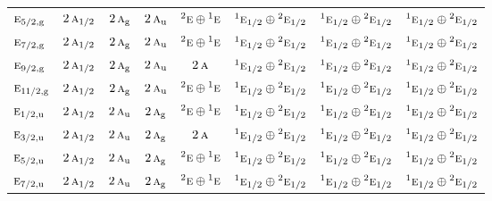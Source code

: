 \documentclass[10pt,a4paper]{article}
\numberwithin{equation}{section}
\newcommand{\irr}[1]{\text{\normalfont\scshape #1}}
\newcommand{\conjpair}[1]{{}^{#1}}
\newcommand{\ptag}[1]{\mathrm{#1}}
\begin{document}
{\begin{longtable}{@{}lccccccc@{}}
$\irr{e}_{5/2,\ptag{g}}$ & $2\,\irr{a}_{1/2}$ & $2\,\irr{a}_{\ptag{g}}$ & $2\,\irr{a}_{\ptag{u}}$ & $\conjpair{2}\irr{e}\oplus \conjpair{1}\irr{e}$ & $\conjpair{1}\irr{e}_{1/2}\oplus \conjpair{2}\irr{e}_{1/2}$ & $\conjpair{1}\irr{e}_{1/2}\oplus \conjpair{2}\irr{e}_{1/2}$ & $\conjpair{1}\irr{e}_{1/2}\oplus \conjpair{2}\irr{e}_{1/2}$\\
$\irr{e}_{7/2,\ptag{g}}$ & $2\,\irr{a}_{1/2}$ & $2\,\irr{a}_{\ptag{g}}$ & $2\,\irr{a}_{\ptag{u}}$ & $\conjpair{2}\irr{e}\oplus \conjpair{1}\irr{e}$ & $\conjpair{1}\irr{e}_{1/2}\oplus \conjpair{2}\irr{e}_{1/2}$ & $\conjpair{1}\irr{e}_{1/2}\oplus \conjpair{2}\irr{e}_{1/2}$ & $\conjpair{1}\irr{e}_{1/2}\oplus \conjpair{2}\irr{e}_{1/2}$\\
$\irr{e}_{9/2,\ptag{g}}$ & $2\,\irr{a}_{1/2}$ & $2\,\irr{a}_{\ptag{g}}$ & $2\,\irr{a}_{\ptag{u}}$ & $2\,\irr{a}$ & $\conjpair{1}\irr{e}_{1/2}\oplus \conjpair{2}\irr{e}_{1/2}$ & $\conjpair{1}\irr{e}_{1/2}\oplus \conjpair{2}\irr{e}_{1/2}$ & $\conjpair{1}\irr{e}_{1/2}\oplus \conjpair{2}\irr{e}_{1/2}$\\
$\irr{e}_{11/2,\ptag{g}}$ & $2\,\irr{a}_{1/2}$ & $2\,\irr{a}_{\ptag{g}}$ & $2\,\irr{a}_{\ptag{u}}$ & $\conjpair{2}\irr{e}\oplus \conjpair{1}\irr{e}$ & $\conjpair{1}\irr{e}_{1/2}\oplus \conjpair{2}\irr{e}_{1/2}$ & $\conjpair{1}\irr{e}_{1/2}\oplus \conjpair{2}\irr{e}_{1/2}$ & $\conjpair{1}\irr{e}_{1/2}\oplus \conjpair{2}\irr{e}_{1/2}$\\
$\irr{e}_{1/2,\ptag{u}}$ & $2\,\irr{a}_{1/2}$ & $2\,\irr{a}_{\ptag{u}}$ & $2\,\irr{a}_{\ptag{g}}$ & $\conjpair{2}\irr{e}\oplus \conjpair{1}\irr{e}$ & $\conjpair{1}\irr{e}_{1/2}\oplus \conjpair{2}\irr{e}_{1/2}$ & $\conjpair{1}\irr{e}_{1/2}\oplus \conjpair{2}\irr{e}_{1/2}$ & $\conjpair{1}\irr{e}_{1/2}\oplus \conjpair{2}\irr{e}_{1/2}$\\
$\irr{e}_{3/2,\ptag{u}}$ & $2\,\irr{a}_{1/2}$ & $2\,\irr{a}_{\ptag{u}}$ & $2\,\irr{a}_{\ptag{g}}$ & $2\,\irr{a}$ & $\conjpair{1}\irr{e}_{1/2}\oplus \conjpair{2}\irr{e}_{1/2}$ & $\conjpair{1}\irr{e}_{1/2}\oplus \conjpair{2}\irr{e}_{1/2}$ & $\conjpair{1}\irr{e}_{1/2}\oplus \conjpair{2}\irr{e}_{1/2}$\\
$\irr{e}_{5/2,\ptag{u}}$ & $2\,\irr{a}_{1/2}$ & $2\,\irr{a}_{\ptag{u}}$ & $2\,\irr{a}_{\ptag{g}}$ & $\conjpair{2}\irr{e}\oplus \conjpair{1}\irr{e}$ & $\conjpair{1}\irr{e}_{1/2}\oplus \conjpair{2}\irr{e}_{1/2}$ & $\conjpair{1}\irr{e}_{1/2}\oplus \conjpair{2}\irr{e}_{1/2}$ & $\conjpair{1}\irr{e}_{1/2}\oplus \conjpair{2}\irr{e}_{1/2}$\\
$\irr{e}_{7/2,\ptag{u}}$ & $2\,\irr{a}_{1/2}$ & $2\,\irr{a}_{\ptag{u}}$ & $2\,\irr{a}_{\ptag{g}}$ & $\conjpair{2}\irr{e}\oplus \conjpair{1}\irr{e}$ & $\conjpair{1}\irr{e}_{1/2}\oplus \conjpair{2}\irr{e}_{1/2}$ & $\conjpair{1}\irr{e}_{1/2}\oplus \conjpair{2}\irr{e}_{1/2}$ & $\conjpair{1}\irr{e}_{1/2}\oplus \conjpair{2}\irr{e}_{1/2}$\\

\end{longtable}}
\end{document}
